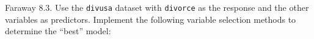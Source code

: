 \documentclass{homework}
\begin{document}
\begin{longproblem}
Faraway 8.3. Use the \texttt{divusa} dataset with \texttt{divorce} as the response and the other variables as predictors. Implement the following variable selection methods to determine the ``best'' model:

\end{longproblem}
\end{document}
